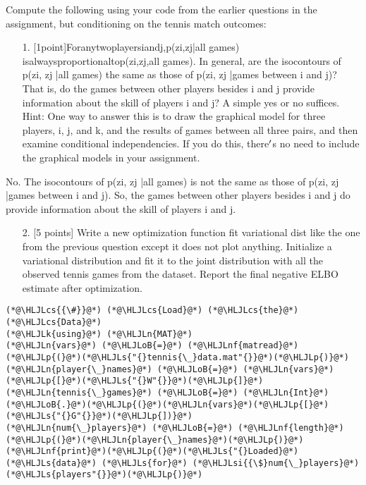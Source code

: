 \documentclass[12pt,a4paper]{article}
\newcommand{\HLJLk}[1]{\textcolor[RGB]{148,91,176}{\textbf{#1}}}
\newcommand{\HLJLn}[1]{#1}
\newcommand{\HLJLnf}[1]{\textcolor[RGB]{66,102,213}{#1}}
\newcommand{\HLJLs}[1]{\textcolor[RGB]{201,61,57}{#1}}
\newcommand{\HLJLsi}[1]{#1}
\newcommand{\HLJLoB}[1]{\textcolor[RGB]{102,102,102}{\textbf{#1}}}
\newcommand{\HLJLp}[1]{#1}
\newcommand{\HLJLcs}[1]{\textcolor[RGB]{153,153,119}{\textit{#1}}}
\begin{document}
Compute the following using your code from the earlier questions in the assignment, but conditioning on the tennis match outcomes:

\begin{itemize}
\item[1. ] [1point]Foranytwoplayersiandj,p(zi,zj|all games) isalwaysproportionaltop(zi,zj,all games). In general, are the isocontours of p(zi, zj |all games) the same as those of p(zi, zj |games between i and j)? That is, do the games between other players besides i and j provide information about the skill of players i and j? A simple yes or no suffices.  Hint: One way to answer this is to draw the graphical model for three players, i, j, and k, and the results of games between all three pairs, and then examine conditional independencies. If you do this, there\ensuremath{\rq}s no need to include the graphical models in your assignment.

\end{itemize}
No. The isocontours of p(zi, zj |all games) is not the same as those of p(zi, zj |games between i and j). So, the games between other players besides i and j do provide information about the skill of players i and j.

\begin{itemize}
\item[2. ] [5 points] Write a new optimization function fit variational dist like the one from the previous question except it does not plot anything. Initialize a variational distribution and fit it to the joint distribution with all the observed tennis games from the dataset. Report the final negative ELBO estimate after optimization.

\end{itemize}

\begin{lstlisting}
(*@\HLJLcs{{\#}}@*) (*@\HLJLcs{Load}@*) (*@\HLJLcs{the}@*) (*@\HLJLcs{Data}@*)
(*@\HLJLk{using}@*) (*@\HLJLn{MAT}@*)
(*@\HLJLn{vars}@*) (*@\HLJLoB{=}@*) (*@\HLJLnf{matread}@*)(*@\HLJLp{(}@*)(*@\HLJLs{"{}tennis{\_}data.mat"{}}@*)(*@\HLJLp{)}@*)
(*@\HLJLn{player{\_}names}@*) (*@\HLJLoB{=}@*) (*@\HLJLn{vars}@*)(*@\HLJLp{[}@*)(*@\HLJLs{"{}W"{}}@*)(*@\HLJLp{]}@*)
(*@\HLJLn{tennis{\_}games}@*) (*@\HLJLoB{=}@*) (*@\HLJLn{Int}@*)(*@\HLJLoB{.}@*)(*@\HLJLp{(}@*)(*@\HLJLn{vars}@*)(*@\HLJLp{[}@*)(*@\HLJLs{"{}G"{}}@*)(*@\HLJLp{])}@*)
(*@\HLJLn{num{\_}players}@*) (*@\HLJLoB{=}@*) (*@\HLJLnf{length}@*)(*@\HLJLp{(}@*)(*@\HLJLn{player{\_}names}@*)(*@\HLJLp{)}@*)
(*@\HLJLnf{print}@*)(*@\HLJLp{(}@*)(*@\HLJLs{"{}Loaded}@*) (*@\HLJLs{data}@*) (*@\HLJLs{for}@*) (*@\HLJLsi{{\$}num{\_}players}@*) (*@\HLJLs{players"{}}@*)(*@\HLJLp{)}@*)
\end{lstlisting}
\end{document}
